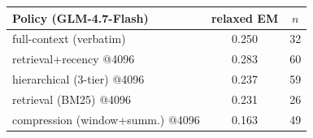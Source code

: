 \begin{tabular}{lcc}
\toprule
Policy (GLM-4.7-Flash) & relaxed EM & $n$ \\
\midrule
full-context (verbatim) & 0.250 & 32 \\
retrieval+recency @4096 & 0.283 & 60 \\
hierarchical (3-tier) @4096 & 0.237 & 59 \\
retrieval (BM25) @4096 & 0.231 & 26 \\
compression (window+summ.) @4096 & 0.163 & 49 \\
\bottomrule
\end{tabular}